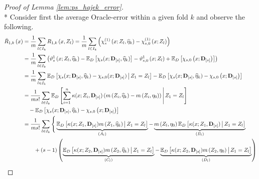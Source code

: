 \begin{proof}[Proof of Lemma \ref{lem:ps_hajek_error}]\mbox{}\\*
    Consider first the average Oracle-error within a given fold $k$ and observe the following.
    \begin{equation}
        \begin{aligned}
            \bar{R}_{1, k}\left(x\right)
            & = \frac{1}{m}\sum_{l \in I_{k}}R_{1, k}\left(x, Z_{l}\right)
            = \frac{1}{m}\sum_{l \in I_{k}}
            \left(\chi_{s}^{(1)}\left(x; Z_l, \hat{\eta}_{k}\right) - \chi_{s,0}^{(1)}\left(x; Z_l\right)\right) \\
            & = \frac{1}{m}\sum_{l \in I_{k}}
            \left(\vartheta_{s}^{1}\left(x; Z_l, \hat{\eta}_{k}\right)
            - \E_{D}\left[\chi_{s}(x; \mathbf{D}_{[s]}, \hat{\eta}_{k})\right]
            - \vartheta_{s,0}^{1}\left(x; Z_l\right) 
            + \E_{D}\left[\chi_{s,0}\left(x; \mathbf{D}_{[s]}\right)\right]\right)\\
            & = \frac{1}{m}\sum_{l \in I_{k}}
            \E_{D}\left[\chi_{s}(x; \mathbf{D}_{[s]}, \hat{\eta}_{k}) - \chi_{s,0}(x; \mathbf{D}_{[s]})\, \middle| \, Z_1 = Z_l \right]
            - \E_{D}\left[\chi_{s}(x; \mathbf{D}_{[s]}, \hat{\eta}_{k}) - \chi_{s,0}\left(x; \mathbf{D}_{[s]}\right)\right] \\
            & = \frac{1}{m s!}\sum_{l \in I_{k}}
            \E_{D}\left[\sum_{i = 1}^{n}\kappa(x; Z_{i}, \mathbf{D}_{[s]})
            \left(m\left(Z_{i}, \hat{\eta}_{k}\right) - m\left(Z_{i}, \eta_{0}\right)\right) \, \middle| \, Z_1 = Z_l \right] \\
            & \quad - \E_{D}\left[\chi_{s}(x; \mathbf{D}_{[s]}, \hat{\eta}_{k}) - \chi_{s,0}\left(x; \mathbf{D}_{[s]}\right)\right] \\
            & = \frac{1}{m s!}\sum_{l \in I_{k}}
            \Bigg\{
                \underbrace{\E_{D}\left[\kappa(x; Z_{1}, \mathbf{D}_{[s]})m\left(Z_{1}, \hat{\eta}_{k}\right)\, \middle| \, Z_1 = Z_l \right]}_{(A_{l})}
                - \underbrace{m\left(Z_{l}, \eta_{0}\right)\E_{D}\left[\kappa(x; Z_{1}, \mathbf{D}_{[s]}) \, \middle| \, Z_1 = Z_l \right]}_{(B_{l})}  \\
            & \quad \quad  + (s-1) \left( \underbrace{\E_{D}\left[\kappa(x; Z_{2}, \mathbf{D}_{[s]})m\left(Z_{2}, \hat{\eta}_{k}\right)\, \middle| \, Z_1 = Z_l \right]}_{(C_{l})}
            - \underbrace{\E_{D}\left[\kappa(x; Z_{2}, \mathbf{D}_{[s]})m\left(Z_{2}, \eta_{0}\right) \, \middle| \, Z_1 = Z_l \right]}_{(D_{l})} \right)

\end{aligned}
\end{equation}
\end{proof}
